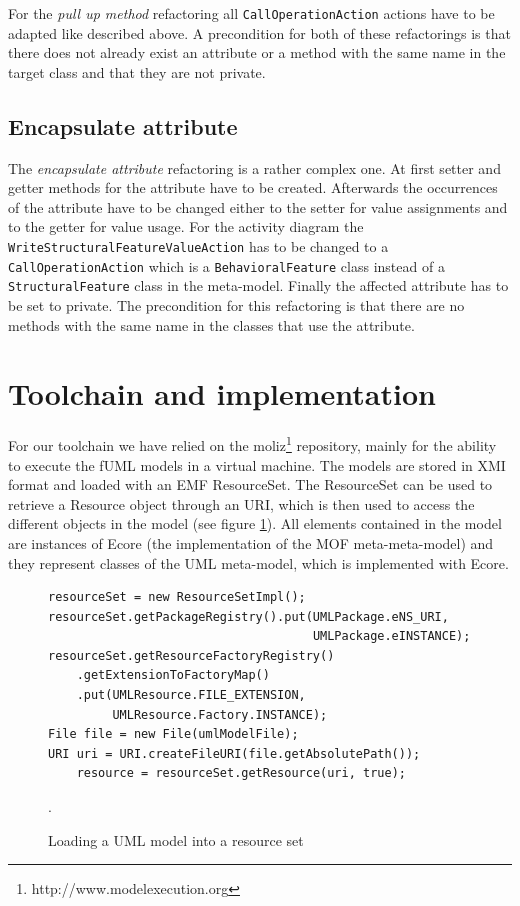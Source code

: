 \documentclass{llncs}
\begin{document}
For the \textit{pull up method} refactoring all \lstinline|CallOperationAction| actions have to be adapted like described 
above. A precondition for both of these refactorings is that there does not already exist an attribute or a method with the same name 
in the target class and that they are not private.

\subsection{Encapsulate attribute}
\label{sec:encapsulate}
The \textit{encapsulate attribute} refactoring is a rather complex one. At first setter and getter methods for the attribute have to be 
created. Afterwards the occurrences of the attribute have to be changed either to the setter for value assignments and to the getter 
for value usage. For the activity diagram the \lstinline|WriteStructuralFeatureValueAction| has to be changed to a 
\lstinline|CallOperationAction| which is a \lstinline|BehavioralFeature| class instead of a \lstinline|StructuralFeature| class in 
the meta-model. Finally the affected attribute has to be set to private. The precondition for this refactoring is that there are no 
methods with the same name in the classes that use the attribute.

\section{Toolchain and implementation}
\label{sec:toolchain}
For our toolchain we have relied on the moliz\footnote{http://www.modelexecution.org} repository, mainly for the ability to execute the fUML 
models in a virtual machine. The models are stored in XMI format and loaded with an EMF ResourceSet. The ResourceSet
can be used to retrieve a Resource object through an URI, which is then used to access the different objects in the model 
(see figure \ref{lst:resourceset}). All elements contained in the model are instances of Ecore (the implementation of
the MOF meta-meta-model) and they represent classes of the UML meta-model, which is implemented with Ecore.

\begin{figure}
 \begin{lstlisting}
resourceSet = new ResourceSetImpl();
resourceSet.getPackageRegistry().put(UMLPackage.eNS_URI,
                                     UMLPackage.eINSTANCE);
resourceSet.getResourceFactoryRegistry()
    .getExtensionToFactoryMap()
    .put(UMLResource.FILE_EXTENSION,
         UMLResource.Factory.INSTANCE);
File file = new File(umlModelFile);
URI uri = URI.createFileURI(file.getAbsolutePath());
    resource = resourceSet.getResource(uri, true);
 \end{lstlisting}
 \caption{Loading a UML model into a resource set}.
 \label{lst:resourceset}
\end{figure}
\end{document}

